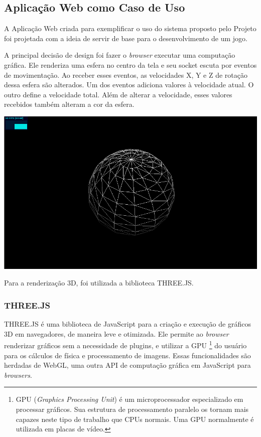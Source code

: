 \documentclass[a4paper,12pt]{article}
\begin{document}
\subsection{Aplicação Web como Caso de Uso}

A Aplicação Web criada para exemplificar o uso do sistema proposto pelo Projeto foi projetada com a ideia de servir de base para o desenvolvimento de um jogo.

A principal decisão de design foi fazer o \emph{browser} executar uma computação gráfica. Ele renderiza uma esfera no centro da tela e seu socket escuta por eventos de movimentação. Ao receber esses eventos, as velocidades X, Y e Z de rotação dessa esfera são alterados. Um dos eventos adiciona valores à velocidade atual. O outro define a velocidade total. Além de alterar a velocidade, esses valores recebidos também alteram a cor da esfera.

\includegraphics[width=1\linewidth]{images/sphere.png}

Para a renderização 3D, foi utilizada a biblioteca THREE.JS.


\subsubsection{THREE.JS}


THREE.JS é uma biblioteca de JavaScript para a criação e execução de gráficos 3D em navegadores, de maneira leve e otimizada. Ele permite ao \emph{browser} renderizar gráficos sem a necessidade de plugins, e utilizar a GPU \footnote{GPU (\emph{Graphics Processing Unit}) é um microprocessador especializado em processar gráficos. Sua estrutura de processamento paralelo os tornam mais capazes neste tipo de trabalho que CPUs normais. Uma GPU normalmente é utilizada em placas de vídeo.} do usuário para os cálculos de física e processamento de imagens. Essas funcionalidades são herdadas de WebGL, uma outra API de computação gráfica em JavaScript para \emph{browsers}.
\end{document}
